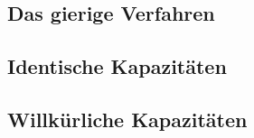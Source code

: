 \begin{frame}
	
\end{frame}

\subsection{Das gierige Verfahren}
\begin{frame}
	\begin{figure}[htbp]
		\centering
		\small
		\def\svgwidth{220bp}
		
		\label{fig:k-coloring}
	\end{figure}
	
	
\end{frame}
	
\subsection{Identische Kapazitäten}
\begin{frame}


\end{frame}


\subsection{Willkürliche Kapazitäten}
\begin{frame}
	
\end{frame}